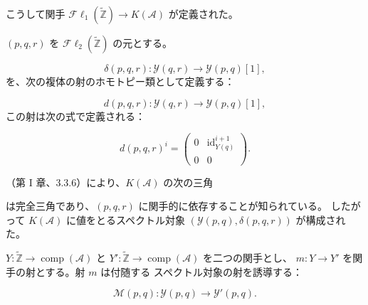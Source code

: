 \clearpage
{}%
\begingroup\small\setlength{\parskip}{0pt}\setlength{\emergencystretch}{1.5em}
\setlength{\abovedisplayskip}{4pt plus 2pt minus 2pt}%
\setlength{\belowdisplayskip}{4pt plus 2pt minus 2pt}%

こうして関手
$\mathcal{F}\ell_1(\widetilde{\mathbb Z})\longrightarrow K(\mathcal A)$
が定義された。

$(p,q,r)$ を $\mathcal{F}\ell_2(\widetilde{\mathbb Z})$ の元とする。

\begin{equation}
\delta(p,q,r)\colon\mathcal Y(q,r)\longrightarrow\mathcal Y(p,q)[1],
\tag{4.1.1.6}
\end{equation}
を、次の複体の射のホモトピー類として定義する：

\begin{equation}
d(p,q,r)\colon\mathcal Y(q,r)\longrightarrow\mathcal Y(p,q)[1],
\tag{4.1.1.7}
\end{equation}
この射は次の式で定義される：

\begin{equation}
d(p,q,r)^i=
\begin{pmatrix}
0 & \operatorname{id}_{Y(q)}^{i+1}\\
0 & 0
\end{pmatrix}.
\tag{4.1.1.8}
\end{equation}

（第 I 章、3.3.6）により、$K(\mathcal A)$ の次の三角

\begin{center}
\end{center}
は完全三角であり、$(p,q,r)$ に関手的に依存することが知られている。
したがって $K(\mathcal A)$ に値をとるスペクトル対象
$(\mathcal Y(p,q),\delta(p,q,r))$ が構成された。

$Y\colon\widetilde{\mathbb Z}\longrightarrow
\operatorname{comp}(\mathcal A)$ と
$Y'\colon\widetilde{\mathbb Z}\longrightarrow
\operatorname{comp}(\mathcal A)$ を二つの関手とし、
$m\colon Y\longrightarrow Y'$ を関手の射とする。射 $m$ は付随する
スペクトル対象の射を誘導する：

\begin{equation}
\mathcal M(p,q)\colon\mathcal Y(p,q)\longrightarrow\mathcal Y'(p,q).
\tag{4.1.1.9}
\end{equation}

